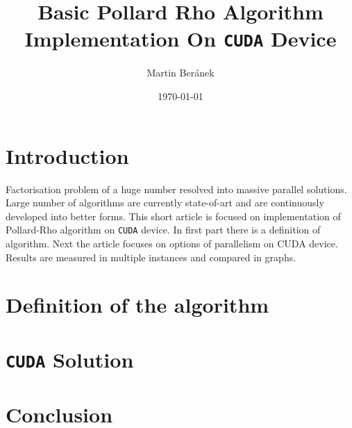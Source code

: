\documentclass[a4paper]{article}
\begin{document}
\title{Basic Pollard Rho Algorithm Implementation On \texttt{CUDA} Device}
\author{Martin Beránek}
\date{\today}
\maketitle


\section{Introduction}

Factorisation problem of a huge number resolved into massive parallel solutions. Large number of algorithms are currently state-of-art and are continuously developed into better forms. This short article is focused on implementation of Pollard-Rho algorithm on \texttt{CUDA} device. In first part there is a definition of algorithm. Next the article focuses on options of parallelism on CUDA device. Results are measured in multiple instances and compared in graphs. 

\section{Definition of the algorithm}


\section{\texttt{CUDA} Solution}


\section{Conclusion}





\appendix
\end{document}
